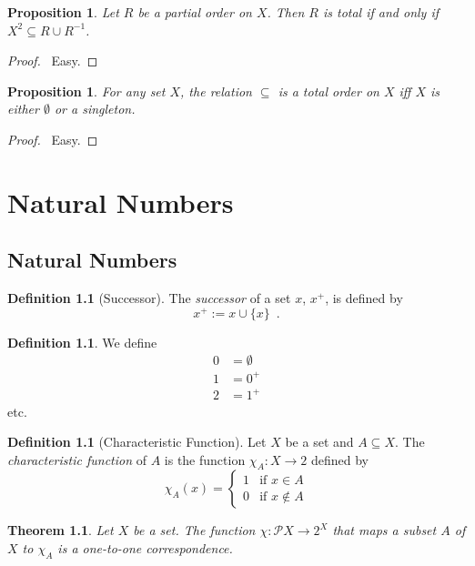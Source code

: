 \documentclass{report}
\let\qed\relax
\newtheorem{prop}[ax]{Proposition}
\newtheorem{thm}[ax]{Theorem}
\theoremstyle{definition}
\newtheorem{df}[ax]{Definition}
\begin{document}
\begin{prop}
Let $R$ be a partial order on $X$. Then $R$ is total if and only if $X^2 \subseteq R \cup R^{-1}$.
\end{prop}

\begin{proof}
\pf\ Easy. \qed
\end{proof}

\begin{prop}
For any set $X$, the relation $\subseteq$ is a total order on $X$ iff $X$ is either $\emptyset$ or a singleton.
\end{prop}

\begin{proof}
\pf\ Easy. \qed
\end{proof}

\chapter{Natural Numbers}

\section{Natural Numbers}

\begin{df}[Successor]
The \emph{successor} of a set $x$, $x^+$, is defined by
\[ x^+ := x \cup \{x\} \enspace . \]
\end{df}

\begin{df}
We define
\begin{align*}
0 & = \emptyset \\
1 & = 0^+ \\
2 & = 1^+
\end{align*}
etc.
\end{df}

\begin{df}[Characteristic Function]
Let $X$ be a set and $A \subseteq X$. The \emph{characteristic function} of $A$ is the function $\chi_A : X \rightarrow 2$ defined by
\[ \chi_A(x) = \begin{cases}
1 & \text{if } x \in A \\
0 & \text{if } x \notin A
\end{cases} \]
\end{df}

\begin{thm}
Let $X$ be a set. The function $\chi : \mathcal{P} X \rightarrow 2^X$ that maps a subset $A$ of $X$ to $\chi_A$ is a one-to-one correspondence.
\end{thm}
\end{document}
